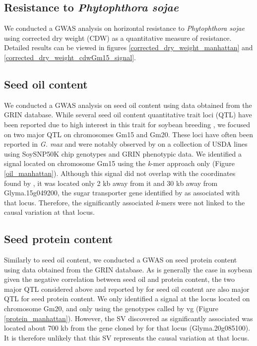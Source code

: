 \subsection*{Resistance to \emph{Phytophthora sojae}}
\label{sv-gwas-resistance}

We conducted a GWAS analysis on horizontal resistance to
\textit{Phytophthora sojae} using corrected dry weight (CDW) as a quantitative
measure of resistance. Detailed results can be viewed in figures
\ref{corrected_dry_weight_manhattan} and
\ref{corrected_dry_weight_cdwGm15_signal}.

\subsection*{Seed oil content}
\label{sv-gwas-seed-oil-content}

We conducted a GWAS analysis on seed oil content using data obtained from the
GRIN database. While several seed oil content quantitative trait loci (QTL)
have been reported due to high interest in this trait for soybean breeding
\citep{chaudhary2015}, we focused on two major QTL on chromosomes Gm15 and Gm20.
These loci have often been reported in \emph{G. max} and were notably observed by
\cite{bandillo2015} on a collection of USDA lines using SoySNP50K chip
genotypes and GRIN phenotypic data. We identified a signal located on
chromosome Gm15 using the \emph{k}-mer approach only (Figure
\ref{oil_manhattan}). Although this signal did not overlap with the coordinates
found by \cite{bandillo2017}, it was located only 2 kb away from it and 30 kb
away from Glyma.15g049200, the sugar transporter gene identified by
\cite{zhang2020} as associated with that locus. Therefore, the significantly
associated \emph{k}-mers were not linked to the causal variation at that locus.

\subsection*{Seed protein content}
\label{sv-gwas-seed-protein-content}

Similarly to seed oil content, we conducted a GWAS on seed protein content
using data obtained from the GRIN database. As is generally the case in
soybean given the negative correlation between seed oil and protein content,
the two major QTL considered above and reported by \cite{bandillo2015} for seed
oil content are also major QTL for seed protein content. We only identified a signal
at the locus located on chromosome Gm20, and only using the genotypes
called by vg (Figure \ref{protein_manhattan}). However, the SV discovered as
significantly associated was located about 700 kb from the gene cloned by
\cite{fliege2022} for that locus (Glyma.20g085100). It is therefore unlikely that this SV
represents the causal variation at that locus.

